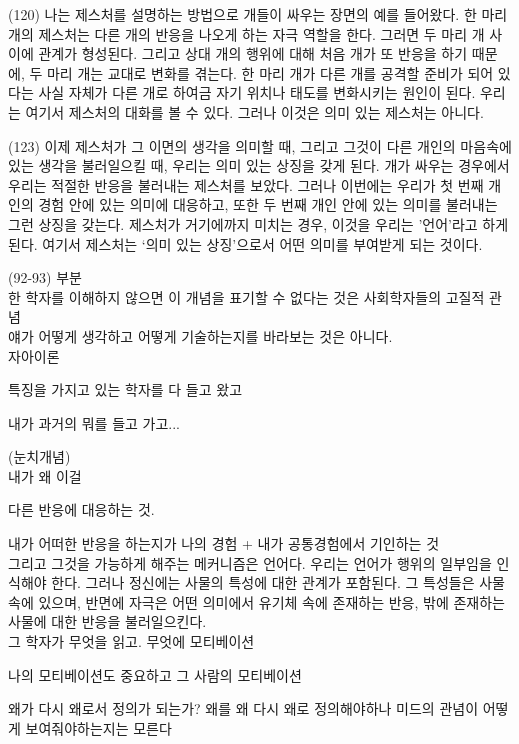\documentclass[12pt, a4paper]{article}
\begin{document}
(120) 나는 제스처를 설명하는 방법으로 개들이 싸우는 장면의 예를 들어왔다. 한 마리 개의 제스처는 다른 개의 반응을 나오게 하는 자극 역할을 한다. 그러면 두 마리 개 사이에 관계가 형성된다. 그리고 상대 개의 행위에 대해 처음 개가 또 반응을 하기 때문에, 두 마리 개는 교대로 변화를 겪는다. 한 마리 개가 다른 개를 공격할 준비가 되어 있다는 사실 자체가 다른 개로 하여금 자기 위치나 태도를 변화시키는 원인이 된다. 우리는 여기서 제스처의 대화를 볼 수 있다. 그러나 이것은 의미 있는 제스처는 아니다.

(123) 이제 제스처가 그 이면의 생각을 의미할 때, 그리고 그것이 다른 개인의 마음속에 있는 생각을 불러일으킬 때, 우리는 의미 있는 상징을 갖게 된다. 개가 싸우는 경우에서 우리는 적절한 반응을 불러내는 제스처를 보았다. 그러나 이번에는 우리가 첫 번째 개인의 경험 안에 있는 의미에 대응하고, 또한 두 번째 개인 안에 있는 의미를 불러내는 그런 상징을 갖는다. 제스처가 거기에까지 미치는 경우, 이것을 우리는 '언어'라고 하게 된다. 여기서 제스처는 `의미 있는 상징'으로서 어떤 의미를 부여받게 되는 것이다.

(92-93) 부분 \\

한 학자를 이해하지 않으면 이 개념을 표기할 수 없다는 것은 사회학자들의 고질적 관념 \\

얘가 어떻게 생각하고 어떻게 기술하는지를 바라보는 것은 아니다. \\

자아이론

특징을 가지고 있는 학자를 다 들고 왔고 

내가 과거의 뭐를 들고 가고...

(눈치개념) \\

내가 왜 이걸 

다른 반응에 대응하는 것.

내가 어떠한 반응을 하는지가 나의 경험 + 내가 공통경험에서 기인하는 것 \\

그리고 그것을 가능하게 해주는 메커니즘은 언어다. 우리는 언어가 행위의 일부임을 인식해야 한다. 그러나 정신에는 사물의 특성에 대한 관계가 포함된다. 그 특성들은 사물 속에 있으며, 반면에 자극은 어떤 의미에서 유기체 속에 존재하는 반응, 밖에 존재하는 사물에 대한 반응을 불러일으킨다. \\

그 학자가 무엇을 읽고. 무엇에 모티베이션

나의 모티베이션도 중요하고 그 사람의 모티베이션

왜가 다시 왜로서 정의가 되는가? 왜를 왜 다시 왜로 정의해야하나
미드의 관념이 어떻게 보여줘야하는지는 모른다
\end{document}
